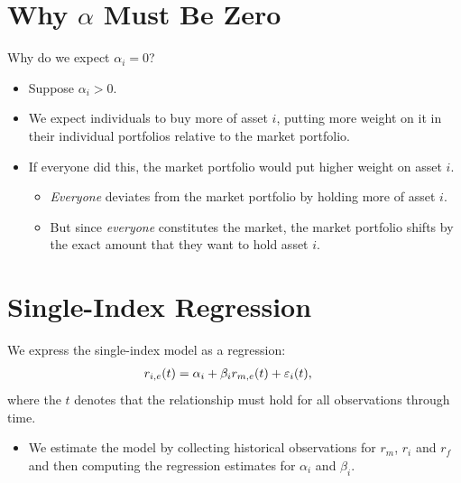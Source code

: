 \documentclass[letterpaper,10pt,english]{sphinxmanual}
\begin{document}
\section{Why $\alpha$ Must Be Zero}
\label{indexModels:why-must-be-zero}
Why do we expect $\alpha_i = 0$?
\begin{itemize}
\item {} 
Suppose $\alpha_i > 0$.

\end{itemize}
\begin{itemize}
\item {} 
We expect individuals to buy more of asset $i$, putting more
weight on it in their individual portfolios relative to the market
portfolio.

\end{itemize}
\begin{itemize}
\item {} 
If everyone did this, the market portfolio would put higher weight
on asset $i$.
\begin{itemize}
\item {} 
\emph{Everyone} deviates from the market portfolio by holding more of
asset $i$.

\end{itemize}
\begin{itemize}
\item {} 
But since \emph{everyone} constitutes the market, the market portfolio
shifts by the exact amount that they want to hold asset $i$.

\end{itemize}

\end{itemize}


\section{Single-Index Regression}
\label{indexModels:single-index-regression}
We express the single-index model as a regression:
\begin{gather}
\begin{split}r_{i,e}(t) & = \alpha_i + \beta_i r_{m,e}(t) + \varepsilon_i(t),\end{split}\notag
\end{gather}
where the $t$ denotes that the relationship must hold for all
observations through time.
\begin{itemize}
\item {} 
We estimate the model by collecting historical
observations for $r_m$, $r_i$ and $r_f$ and then
computing the regression  estimates for $\alpha_i$
and $\beta_i$.

\end{itemize}
\end{document}
